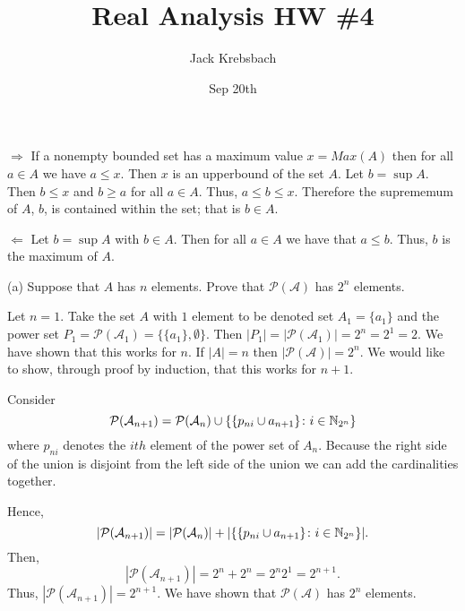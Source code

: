\documentclass{report}
\title{Real Analysis HW \#4}
\author{Jack Krebsbach }
\date{Sep 20th}
\begin{document}
\maketitle
{}

\sol 

\begin{myproof}
    
\smallskip  
$\Rightarrow$ If a nonempty bounded set has a maximum value $x= Max(A)$ then for all $a \in A$ we have $ a \leq x.$ Then $x$ is an upperbound of the set $A.$ Let $b= \sup A.$ Then $b \leq x$  and $b \geq a$ for all $a \in A$. Thus, $a \leq b \leq x.$ Therefore the suprememum of $A$, $b$, is contained within the set; that is $b \in A.$  

$\Leftarrow$
Let $b = \sup A$ with $b \in A.$ Then for all $a \in A$ we have that $a \leq b.$ Thus, $b$ is the maximum of $A.$ 

\end{myproof}


(a) Suppose that $A$ has $n$ elements. Prove that $\mathcal{P}(\mathcal{A})$ has $2^n$ elements.
\bigskip
\par
\sol

Let $n=1.$ Take the set $A$ with $1$ element to be denoted set $A_1=\{ a_1 \}$ and the power set $P_1 = \mathcal{P}(\mathcal{A}_1)= \{\{a_1\}, \emptyset \}.$ Then $|P_1| = |\mathcal{P}(\mathcal{A}_1)|= 2^n  = 2^1 = 2.$  We have shown that this works for $n$. If $
|A| = n$ then $|\mathcal{P}(\mathcal{A})| = 2^{n}.$ We would like to show, through proof by induction, that this works for $n+1.$ \par
Consider $$\mathcal{P}(\mathcal{A}_{n+1}) = \mathcal{P}(\mathcal{A}_{n}) \cup  \{ \{p_{ni}\cup {a_{n+1}}\} \colon i  \in \NN_{2^n}\}$$  where $p_{ni}$ denotes the $ith$ element of the power set of $A_n.$ Because the right side of the union is disjoint from the left side of the union we can add the cardinalities together.

Hence, $$ |\mathcal{P}(\mathcal{A}_{n+1})| = |\mathcal{P}(\mathcal{A}_{n})| + |\{ \{p_{ni}\cup {a_{n+1}}\} \colon i  \in \NN_{2^n}\}|.$$
Then,
$$ |\mathcal{P}(\mathcal{A}_{n+1})| = 2^n +2^n= 2^n2^1 = 2^{n+1}.$$ Thus, $|\mathcal{P}(\mathcal{A}_{n+1})| = 2^{n+1}.$ We have shown that $\mathcal{P}(\mathcal{A})$ has $2^n$ elements.
\end{document}

